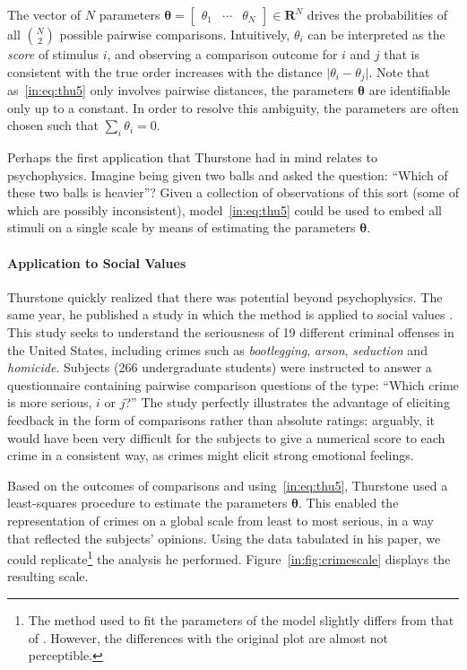 The vector of $N$ parameters $\bm{\theta} = \begin{bmatrix}\theta_1 & \cdots & \theta_N\end{bmatrix} \in \mathbf{R}^N$ drives the probabilities of all $\binom{N}{2}$ possible pairwise comparisons.
Intuitively, $\theta_i$ can be interpreted as the \emph{score} of stimulus $i$, and observing a comparison outcome for $i$ and $j$ that is consistent with the true order increases with the distance $\lvert \theta_i - \theta_j \rvert$.
Note that as~\eqref{in:eq:thu5} only involves pairwise distances, the parameters $\bm{\theta}$ are identifiable only up to a constant.
In order to resolve this ambiguity, the parameters are often chosen such that $\sum_i \theta_i = 0$.

Perhaps the first application that Thurstone had in mind relates to psychophysics.
Imagine being given two balls and asked the question: ``Which of these two balls is heavier''?
Given a collection of observations of this sort (some of which are possibly inconsistent), model~\eqref{in:eq:thu5} could be used to embed all stimuli on a single scale by means of estimating the parameters $\bm{\theta}$.

\paragraph{Application to Social Values}
Thurstone quickly realized that there was potential beyond psychophysics.
The same year, he published a study in which the method is applied to social values \citep{thurstone1927method}.
This study seeks to understand the seriousness of \num{19} different criminal offenses in the United States, including crimes such as \emph{bootlegging}, \emph{arson}, \emph{seduction} and \emph{homicide}.
Subjects (266 undergraduate students) were instructed to answer a questionnaire containing pairwise comparison questions of the type: ``Which crime is more serious, $i$ or $j$?''
The study perfectly illustrates the advantage of eliciting feedback in the form of comparisons rather than absolute ratings:
arguably, it would have been very difficult for the subjects to give a numerical score to each crime in a consistent way, as crimes might elicit strong emotional feelings.

Based on the outcomes of comparisons and using~\eqref{in:eq:thu5}, Thurstone used a least-squares procedure to estimate the parameters $\bm{\theta}$.
This enabled the representation of crimes on a global scale from least to most serious, in a way that reflected the subjects' opinions.
Using the data tabulated in his \citeyear{thurstone1927method} paper, we could replicate\footnote{%
The method used to fit the parameters of the model slightly differs from that of \citet{thurstone1927method}.
However, the differences with the original plot are almost not perceptible.} the analysis he performed.
Figure~\ref{in:fig:crimescale} displays the resulting scale.

